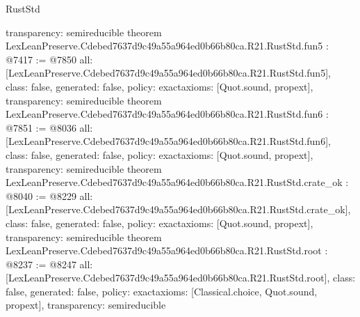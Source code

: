 \begin{lexlean}{RustStd}
\begin{coremodule}
{  transparency: semireducible
}
theorem LexLeanPreserve.Cdebed7637d9c49a55a964ed0b66b80ca.R21.RustStd.fun5 : @7417 := @7850 {
  all: [LexLeanPreserve.Cdebed7637d9c49a55a964ed0b66b80ca.R21.RustStd.fun5],
  class: false,
  generated: false,
  policy: exact{axioms: [Quot.sound, propext]},
  transparency: semireducible
}
theorem LexLeanPreserve.Cdebed7637d9c49a55a964ed0b66b80ca.R21.RustStd.fun6 : @7851 := @8036 {
  all: [LexLeanPreserve.Cdebed7637d9c49a55a964ed0b66b80ca.R21.RustStd.fun6],
  class: false,
  generated: false,
  policy: exact{axioms: [Quot.sound, propext]},
  transparency: semireducible
}
theorem LexLeanPreserve.Cdebed7637d9c49a55a964ed0b66b80ca.R21.RustStd.crate_ok : @8040 := @8229 {
  all: [LexLeanPreserve.Cdebed7637d9c49a55a964ed0b66b80ca.R21.RustStd.crate_ok],
  class: false,
  generated: false,
  policy: exact{axioms: [Quot.sound, propext]},
  transparency: semireducible
}
theorem LexLeanPreserve.Cdebed7637d9c49a55a964ed0b66b80ca.R21.RustStd.root : @8237 := @8247 {
  all: [LexLeanPreserve.Cdebed7637d9c49a55a964ed0b66b80ca.R21.RustStd.root],
  class: false,
  generated: false,
  policy: exact{axioms: [Classical.choice, Quot.sound, propext]},
  transparency: semireducible
}


\end{coremodule}
\end{lexlean}
